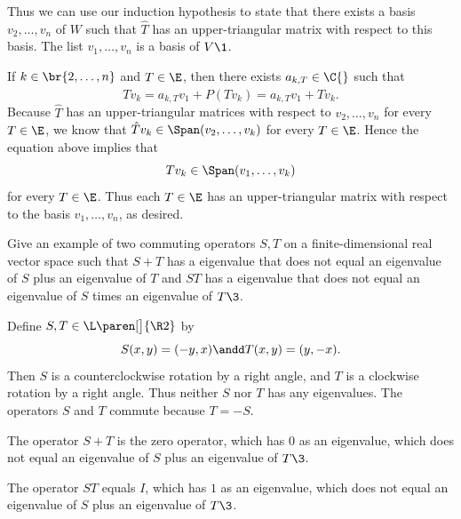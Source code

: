 \begin{Solution}
\begin{subtheorem}
Thus we can use our induction hypothesis to state that there exists a basis $v_2, \ldots, v_n$ of $W$ such that $\hat T$ has an upper-triangular matrix with respect to this basis. The list $v_1, \ldots, v_n$ is a basis of $V\1$.

If $k \in \br{2, \ldots, n}$ and $T \in \E$, then there exists $a_{k,T} \in \C{}$ such that
\[
Tv_k = a_{k,T} v_1 + P(Tv_k) = a_{k,T} v_1 + \hat T v_k.
\]
Because $\hat T$ has an upper-triangular matrices with respect to $v_2, \ldots, v_n$ for every $T \in \E$, we know that
$\hat T v_k \in \Span(v_2, \ldots, v_k)$ for every $T \in \E$. Hence the equation above implies that
\[
Tv_k \in \Span(v_1, \ldots, v_k)
\]
for every $T \in \E$. Thus each $T \in \E$ has an upper-triangular matrix with respect to the basis $v_1, \ldots, v_n$, as desired.%
\end{subtheorem}
\end{Solution}

\exercise
Give an example of two commuting operators $S, T$ on a finite-dimensional real vector space such that $S+T$ has a eigenvalue that does not equal an eigenvalue of $S$ plus an eigenvalue of $T$ and $ST$ has a eigenvalue that does not equal an eigenvalue of $S$ times an eigenvalue of $T\3$.

\begin{Solution}
Define $S, T \in \L\paren[\big]{\R2}$ by
\[
S(x, y) = (-y, x) \andd T(x, y) = (y, -x).
\]
Then $S$ is a counterclockwise rotation by a right angle, and $T$ is a clockwise rotation by a right angle. Thus neither $S$ nor $T$ has any eigenvalues. The operators $S$ and $T$ commute because $T = -S$.

The operator $S + T$ is the zero operator, which has $0$ as an eigenvalue, which does not  equal an eigenvalue of $S$ plus an eigenvalue of $T\3$.

The operator $S T$ equals $I$, which has $1$ as an eigenvalue, which does not  equal an eigenvalue of $S$ plus an eigenvalue of $T\3$.
\end{Solution}

